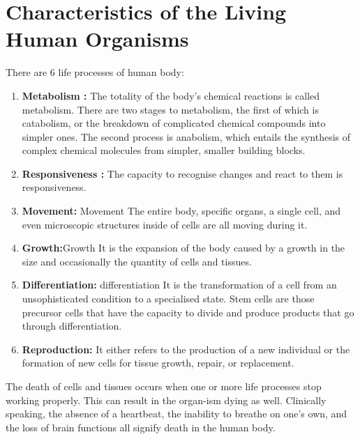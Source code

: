 \documentclass[12pt]{article}
\begin{document}
\section{Characteristics of the Living Human Organisms}
There are 6 life processes of human body:
\begin{enumerate}
    \item \textbf{Metabolism :} The totality of the body's chemical reactions is called metabolism. There are two stages to metabolism, the first of which is catabolism, or the breakdown of complicated chemical compounds into simpler ones. The second process is anabolism, which entails the synthesis of complex chemical molecules from simpler, smaller building blocks.
    \item \textbf{Responsiveness :} The capacity to recognise changes and react to them is responsiveness.
    \item \textbf{Movement:} Movement The entire body, specific organs, a single cell, and even microscopic structures inside of cells are all moving during it.
    \item \textbf{Growth:}Growth It is the expansion of the body caused by a growth in the size and occasionally the quantity of cells and tissues.
    \item \textbf{Differentiation:} differentiation It is the transformation of a cell from an unsophisticated condition to a specialised state. Stem cells are those precursor cells that have the capacity to divide and produce products that go through differentiation.
    \item \textbf{Reproduction:} It either refers to the production of a new individual or the formation of new cells for tissue growth, repair, or replacement.
\end{enumerate}
The death of cells and tissues occurs when one or more life processes stop working properly. This can result in the organ-ism dying as well. Clinically speaking, the absence of a heartbeat, the inability to breathe on one's own, and the loss of brain functions all signify death in the human body.
\end{document}
